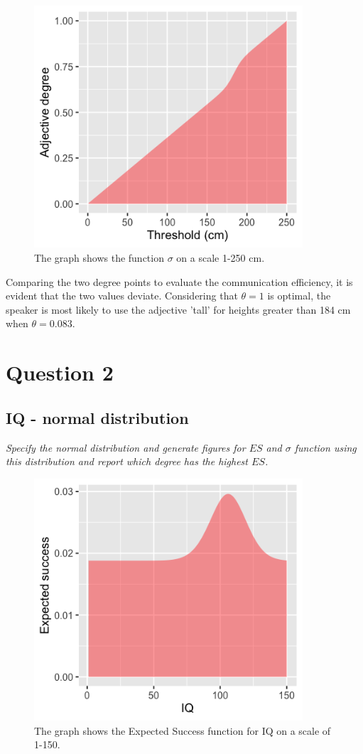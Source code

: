 \documentclass[11pt,a4paper,oneside]{article}
\begin{document}
\begin{figure}[H]
    \centering
    \includegraphics[width=100mm]{figs/Question_1_sigma.png}
    \caption{The graph shows the function $\sigma$ on a scale 1-250 cm.}
  \label{fig:q1_sigma}
\end{figure}

Comparing the two degree points to evaluate the communication efficiency, it is evident that the two values deviate. Considering that $\theta = 1$ is optimal, the speaker is most likely to use the adjective 'tall' for heights greater than 184 cm when $\theta = 0.083$. 

\section{Question 2}
\label{Q2}
\subsection{IQ - normal distribution}
\textit{Specify the normal distribution and generate figures for $ES$ and $\sigma$ function using this distribution and report which degree has the highest $ES$.}\\

\begin{figure}[H]
    \centering
    \includegraphics[width=100mm]{figs/Question_2_IQ_es.png}
    \caption{The graph shows the Expected Success function for IQ on a scale of 1-150.}
  \label{fig:q2_iq_es}
\end{figure}
\end{document}
